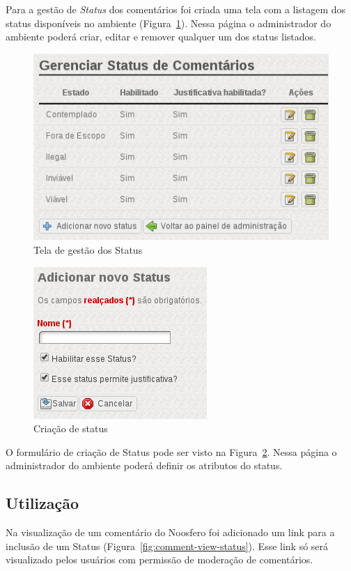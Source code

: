 \documentclass[11pt]{article}
\begin{document}
Para a gestão de {\it Status} dos comentários foi criada uma tela com
a listagem dos status disponíveis no ambiente
(Figura~\ref{fig:plugin-status-admin}). Nessa página o administrador
do ambiente poderá criar, editar e remover qualquer um dos status
listados.

\begin{figure}[h]
\center
\includegraphics[scale=0.9]{plugin-status-admin.png}
\caption{Tela de gestão dos Status}
\label{fig:plugin-status-admin}
\end{figure}

\begin{figure}[h]
\center
\includegraphics[scale=0.7]{new-status-page.png}
\caption{Criação de status}
\label{fig:new-status-page}
\end{figure}

O formulário de criação de Status pode ser visto na
Figura~\ref{fig:new-status-page}. Nessa página o administrador
do ambiente poderá definir os atributos do status.

\subsection{Utilização}

Na visualização de um comentário do Noosfero foi adicionado um link para
a inclusão de um Status (Figura~\ref{fig:comment-view-status}). Esse
link só será visualizado pelos usuários com permissão de moderação de
comentários.
\end{document}
